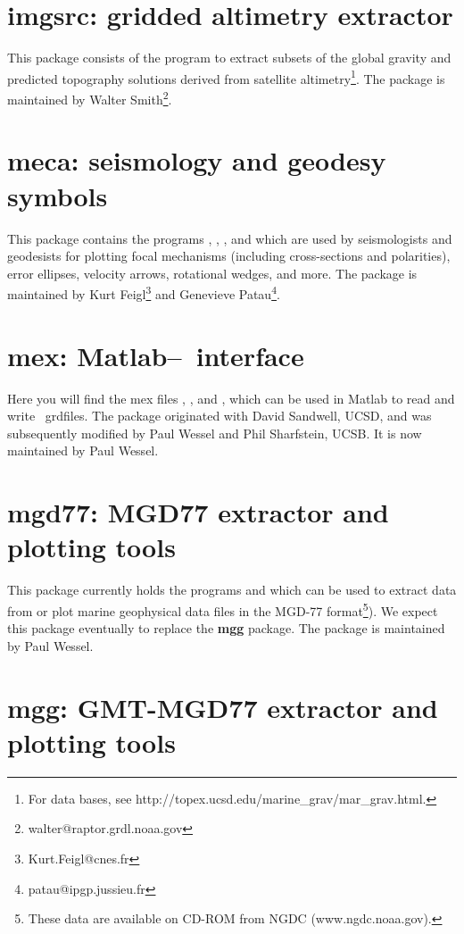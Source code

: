 \section{imgsrc: gridded altimetry extractor}

This package consists of the program  to
extract subsets of the global gravity and predicted topography
solutions derived from satellite altimetry\footnote{For data bases,
see http://topex.ucsd.edu/marine\_grav/mar\_grav.html.}.  The package
is maintained by Walter Smith\footnote{walter@raptor.grdl.noaa.gov}.

\section{meca: seismology and geodesy symbols}

This package contains the programs , ,
, and  which are used
by seismologists and geodesists for plotting focal mechanisms (including
cross-sections and polarities), error ellipses, velocity arrows, rotational
wedges, and more.  The package is maintained by
Kurt Feigl\footnote{Kurt.Feigl@cnes.fr} and
Genevieve Patau\footnote{patau@ipgp.jussieu.fr}.

\section{mex: Matlab--\gmt\ interface}

Here you will find the mex files , ,
and , which can be used in Matlab to read and write
\GMT\ grdfiles.  The package originated with David Sandwell, UCSD,
and was subsequently modified by Paul Wessel and Phil Sharfstein, UCSB.
It is now maintained by Paul Wessel.

\section{mgd77: MGD77 extractor and plotting tools}

This package currently holds the programs  and
 which can be
used to extract data from or plot marine geophysical
data files in the MGD-77 format\footnote{These data are available on CD-ROM from NGDC
(www.ngdc.noaa.gov).}).  We expect this package eventually to replace the {\bf mgg} package.
The package is maintained by Paul Wessel.

\section{mgg: GMT-MGD77 extractor and plotting tools}

